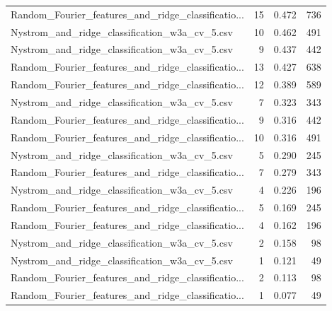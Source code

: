 \begin{tabularx}{\textwidth}{lrrr}
Random\_Fourier\_features\_and\_ridge\_classificatio... &       15 &               0.472 &           736 \\
     Nystrom\_and\_ridge\_classification\_w3a\_cv\_5.csv &       10 &               0.462 &           491 \\
     Nystrom\_and\_ridge\_classification\_w3a\_cv\_5.csv &        9 &               0.437 &           442 \\
Random\_Fourier\_features\_and\_ridge\_classificatio... &       13 &               0.427 &           638 \\
Random\_Fourier\_features\_and\_ridge\_classificatio... &       12 &               0.389 &           589 \\
     Nystrom\_and\_ridge\_classification\_w3a\_cv\_5.csv &        7 &               0.323 &           343 \\
Random\_Fourier\_features\_and\_ridge\_classificatio... &        9 &               0.316 &           442 \\
Random\_Fourier\_features\_and\_ridge\_classificatio... &       10 &               0.316 &           491 \\
     Nystrom\_and\_ridge\_classification\_w3a\_cv\_5.csv &        5 &               0.290 &           245 \\
Random\_Fourier\_features\_and\_ridge\_classificatio... &        7 &               0.279 &           343 \\
     Nystrom\_and\_ridge\_classification\_w3a\_cv\_5.csv &        4 &               0.226 &           196 \\
Random\_Fourier\_features\_and\_ridge\_classificatio... &        5 &               0.169 &           245 \\
Random\_Fourier\_features\_and\_ridge\_classificatio... &        4 &               0.162 &           196 \\
     Nystrom\_and\_ridge\_classification\_w3a\_cv\_5.csv &        2 &               0.158 &            98 \\
     Nystrom\_and\_ridge\_classification\_w3a\_cv\_5.csv &        1 &               0.121 &            49 \\
Random\_Fourier\_features\_and\_ridge\_classificatio... &        2 &               0.113 &            98 \\
Random\_Fourier\_features\_and\_ridge\_classificatio... &        1 &               0.077 &            49 \\
\bottomrule
\end{tabularx}
